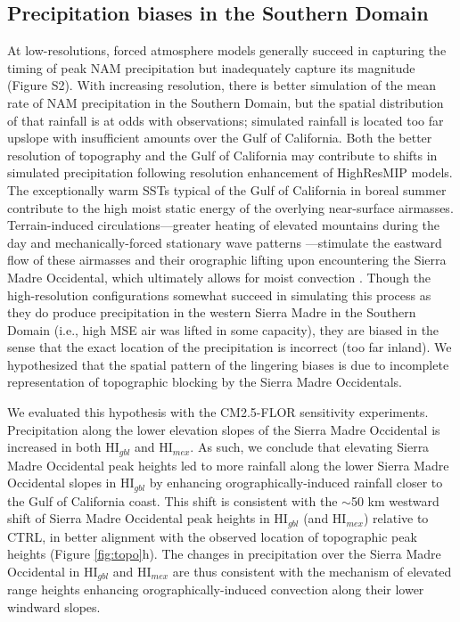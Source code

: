 \documentclass[draft]{agujournal2019}
\begin{document}
\subsection{Precipitation biases in the Southern Domain}
At low-resolutions, forced atmosphere models generally succeed in capturing the timing of peak NAM precipitation but inadequately capture its magnitude (Figure S2). With increasing resolution, there is better simulation of the mean rate of NAM precipitation in the Southern Domain, but the spatial distribution of that rainfall is at odds with observations; simulated rainfall is located too far upslope with insufficient amounts over the Gulf of California. Both the better resolution of topography and the Gulf of California may contribute to shifts in simulated precipitation following resolution enhancement of HighResMIP models. The exceptionally warm SSTs typical of the Gulf of California in boreal summer contribute to the high moist static energy of the overlying near-surface airmasses. Terrain-induced circulations---greater heating of elevated mountains during the day and mechanically-forced stationary wave patterns \cite{boos21n}---stimulate the eastward flow of these airmasses and their orographic lifting upon encountering the Sierra Madre Occidental, which ultimately allows for moist convection \cite{varuolo-clarke19jc,boos21n}. Though the high-resolution configurations somewhat succeed in simulating this process as they do produce precipitation in the western Sierra Madre in the Southern Domain (i.e., high MSE air was lifted in some capacity), they are biased in the sense that the exact location of the precipitation is incorrect (too far inland). We hypothesized that the spatial pattern of the lingering biases is due to incomplete representation of topographic blocking by the Sierra Madre Occidentals. 

We evaluated this hypothesis with the CM2.5-FLOR sensitivity experiments. Precipitation along the lower elevation slopes of the Sierra Madre Occidental is increased in both HI$_{gbl}$ and HI$_{mex}$. As such, we conclude that elevating Sierra Madre Occidental peak heights led to more rainfall along the lower Sierra Madre Occidental slopes in HI$_{gbl}$ by enhancing orographically-induced rainfall closer to the Gulf of California coast. This shift is consistent with the $\sim$50 km westward shift of Sierra Madre Occidental peak heights in HI$_{gbl}$ (and HI$_{mex}$) relative to CTRL, in better alignment with the observed location of topographic peak heights (Figure \ref{fig:topo}h). The changes in precipitation over the Sierra Madre Occidental in HI$_{gbl}$ and HI$_{mex}$ are thus consistent with the mechanism of elevated range heights enhancing orographically-induced convection along their lower windward slopes. 
\end{document}

